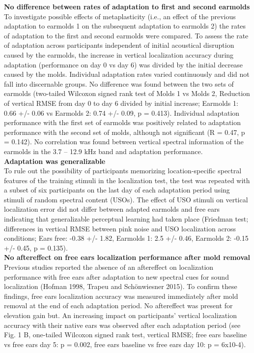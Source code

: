 \begin{multicols}{2}
\noindent %

\noindent \textbf{No difference between rates of adaptation to first and second earmolds}\\
To investigate possible effects of metaplasticity (i.e., an effect of the previous adaptation to earmolds 1 on the subsequent adaptation to earmolds 2) the rates of adaptation to the first and second earmolds were compared. To assess the rate of adaptation across participants independent of initial acoustical disruption caused by the earmolds, the increase in vertical localization accuracy during adaptation (performance on day 0 vs day 6) was divided by the initial decrease caused by the molds. Individual adaptation rates varied continuously and did not fall into discernable groups. No difference was found between the two sets of earmolds (two-tailed Wilcoxon signed rank test of Molds 1 vs Molds 2, Reduction of vertical RMSE from day 0 to day 6 divided by initial increase; Earmolds 1: 0.66 +/- 0.06 vs Earmolds 2:  0.74 +/- 0.09, p = 0.413). Individual adaptation performance with the first set of earmolds was positively related to adaptation performance with the second set of molds, although not significant (R = 0.47, p = 0.142). No correlation was found between vertical spectral information of the earmolds in the 3.7 – 12.9 kHz band and adaptation performance.\\

\noindent\textbf{Adaptation was generalizable}\\
To rule out the possibility of participants memorizing location-specific spectral features of the training stimuli in the localization test, the test was repeated with a subset of six participants on the last day of each adaptation period using stimuli of random spectral content (USOs). The effect of USO stimuli on vertical localization error did not differ between adapted earmolds and free ears indicating that generalizable perceptual learning had taken place (Friedman test; differences in vertical RMSE between pink noise and USO localization across conditions; Ears free: -0.38 +/- 1.82, Earmolds 1: 2.5 +/- 0.46, Earmolds 2: -0.15 +/- 0.45, p = 0.135).\\

\noindent\textbf{No aftereffect on free ears localization performance after mold removal}\\
Previous studies reported the absence of an aftereffect on localization performance with free ears after adaptation to new spectral cues for sound localization (Hofman 1998, Trapeu and Schönwiesner 2015). To confirm these findings, free ears localization accuracy was measured immediately after mold removal at the end of each adaptation period. 
No aftereffect was present for elevation gain but. An increasing impact on participants’ vertical localization accuracy with their native ears was observed after each adaptation period (see Fig. 1 B, one-tailed Wilcoxon signed rank test, vertical RMSE; free ears baseline vs free ears day 5: p = 0.002, free ears baseline vs free ears day 10: p = 6x10-4). \\




\end{multicols}
